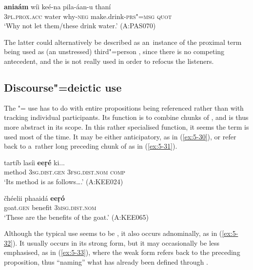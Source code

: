 \begin{exe}
\ex
\label{ex:5-29}
\gll \textbf{aniaám} wíi keé-na pila-áan-u thaní \\
\textsc{3pl.prox.acc} water why-\textsc{neg} make.drink-\textsc{prs"=msg} \textsc{quot}\\
\glt `Why not let them/these drink water.' (A:PAS070)
\end{exe}
The latter could alternatively be described as an~instance of the proximal term being used as (an unstressed) third"=person , since there is no competing antecedent, and the  is not really used in order to refocus the listeners.

\subsection{Discourse"={deictic} use}
\label{subsec:5-2-5}

The "= use has to do with entire propositions being referenced rather than with tracking individual  participants. Its function is to combine chunks of  \citep[432]{diessel2006}, and is thus more abstract in its scope. In this rather specialised function, it seems the  term is used most of the time. It may be either anticipatory, as in (\ref{ex:5-30}), or refer back to a~rather long preceding chunk of  as in (\ref{ex:5-31}).

\begin{exe}
\ex
\label{ex:5-30}
\gll tartíb lasíi \textbf{eeṛé} ki...\\
method \textsc{3sg}.\textsc{dist.gen} \textsc{3fsg}.\textsc{dist.nom} \textsc{comp}\\
\glt `Its method is as follows{\ldots}.' (A:KEE024)

\ex
\label{ex:5-31}
\gll čhéelii phaaidá \textbf{eeṛó}\\
goat.\textsc{gen} benefit \textsc{3msg}.\textsc{dist.nom}\\
\glt `These are the benefits of the goat.' (A:KEE065)
\end{exe}

Although the typical use seems to be , it also occurs adnominally, as in (\ref{ex:5-32}). It usually occurs in its strong form, but it may occasionally be less emphasised, as in (\ref{ex:5-33}), where the weak form refers back to the preceding proposition, thus ``naming'' what has already been defined through .

